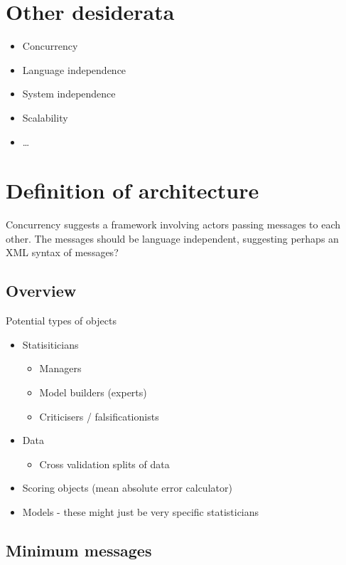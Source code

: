 \documentclass[twoside,11pt]{article}
\begin{document}
\section{Other desiderata}

\begin{itemize}
  \item Concurrency
  \item Language independence
  \item System independence
  \item Scalability
  \item \dots
\end{itemize}

\section{Definition of architecture}

Concurrency suggests a framework involving actors passing messages to each other.
The messages should be language independent, suggesting perhaps an XML syntax of messages?

\subsection{Overview}

Potential types of objects
\begin{itemize}
  \item Statisiticians
  \begin{itemize}
    \item Managers
    \item Model builders (experts)
    \item Criticisers / falsificationists
  \end{itemize}
  \item Data
  \begin{itemize}
    \item Cross validation splits of data
  \end{itemize}
  \item Scoring objects (\eg mean absolute error calculator)
  \item Models - these might just be very specific statisticians 
\end{itemize}

\subsection{Minimum messages}
\end{document}

